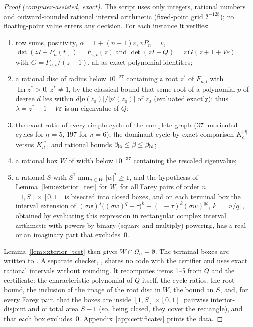 \documentclass[11pt,a4paper]{article}
\numberwithin{equation}{section}
\theoremstyle{definition}
\theoremstyle{remark}
\newcommand{\Om}{\Omega}
\newcommand{\eps}{\varepsilon}
\begin{document}
\begin{proof}[Proof (computer-assisted, exact)]
The script  uses only integers,
rational numbers and outward-rounded rational interval arithmetic
(fixed-point grid \(2^{-128}\)); no floating-point value enters any
decision. For each instance it verifies:
\begin{enumerate}
\item row sums, positivity, \(\alpha=1+(n-1)\eps\), \(vP_n=v\),
\(\det(zI-P_n(t))=F_{n,t}(z)\) and
\(\det(zI-Q)=z\,G(z+1+V\eps)\) with \(G=F_{n,t}/(z-1)\), all as exact
polynomial identities;
\item a rational disc of radius below \(10^{-27}\) containing a root
\(z^*\) of \(F_{n,t}\) with \(\operatorname{Im}z^*>0\), \(z^*\ne1\), by
the classical bound that some root of a polynomial \(p\) of degree
\(d\) lies within \(d|p(z_0)|/|p'(z_0)|\) of \(z_0\) (evaluated
exactly); thus \(\lambda=z^*-1-V\eps\) is an eigenvalue of \(Q\);
\item the exact ratio of every simple cycle of the complete graph
(\(37\) unoriented cycles for \(n=5\), \(197\) for \(n=6\)), the
dominant cycle by exact comparison \(K_c^{|d|}\) versus \(K_d^{|c|}\),
and rational bounds \(\beta_{\rm lo}\le\beta\le\beta_{\rm hi}\);
\item a rational box \(W\) of width below \(10^{-37}\) containing the
rescaled eigenvalue;
\item a rational \(S\) with \(S^2\min_{w\in W}|w|^2\ge1\), and the
hypothesis of Lemma~\ref{lem:exterior_test} for \(W\), for all Farey
pairs of order \(n\): \([1,S]\times[0,1]\) is bisected into closed
boxes, and on each terminal box the interval extension of
\((\sigma w)^s\bigl((\sigma w)^q-\tau\bigr)^k-(1-\tau)^k(\sigma w)^{qk}\),
\(k=\lfloor n/q\rfloor\), obtained by evaluating this expression in
rectangular complex interval arithmetic with powers by binary
(square-and-multiply) powering, has a real or an imaginary part that
excludes~\(0\).
\end{enumerate}
Lemma~\ref{lem:exterior_test} then gives \(W\cap\Om_n=\emptyset\).
The terminal boxes are written to .
A separate checker, , shares no
code with the certifier and uses exact rational intervals without
rounding. It recomputes items 1--5 from \(Q\) and the certificate: the
characteristic polynomial of \(Q\) itself, the cycle ratios, the root
bound, the inclusion of the image of the root disc in \(W\), the bound
on \(S\), and, for every Farey pair, that the boxes are inside
\([1,S]\times[0,1]\), pairwise interior-disjoint and of total area
\(S-1\) (so, being closed, they cover the rectangle), and that each
box excludes~\(0\). Appendix~\ref{app:certificates} prints the data.
\end{proof}
\end{document}
